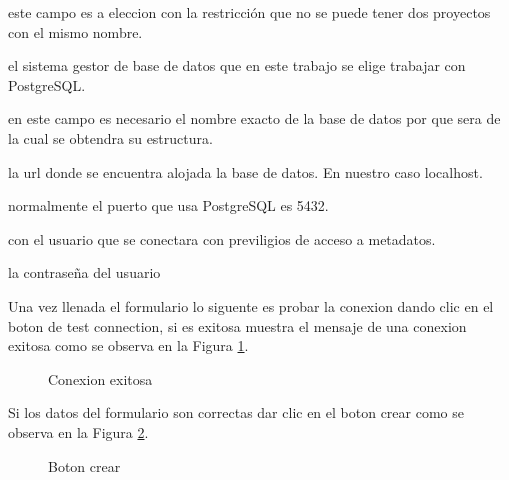 \begin{description}[align=left]
\item [Nombre] este campo es a eleccion con la restricci\'on que no se puede tener dos proyectos con el mismo nombre.
\item [sgbd] el sistema gestor de base de datos que en este trabajo se elige trabajar con PostgreSQL.
\item [base de datos] en este campo es necesario el nombre exacto de la base de datos por que sera de la cual se obtendra su estructura.
\item [host] la url donde se encuentra alojada la base de datos. En nuestro caso localhost.
\item [puerto] normalmente el puerto que usa PostgreSQL es 5432.
\item [usuario] con el usuario que se conectara con previligios de acceso a metadatos.
\item [password] la contrase\~na del usuario
\end{description}
Una vez llenada el formulario lo siguente es probar la conexion dando clic en el boton de test connection, si es exitosa muestra el mensaje de una conexion exitosa como se observa en la Figura \ref{fig:connectionsuccessfull}.
\begin{figure}[H]
\caption{Conexion exitosa} \label{fig:connectionsuccessfull}
\centering
{}
\end{figure}
Si los datos del formulario son correctas dar clic en el boton crear como se observa en la  Figura \ref{fig:createbutton}. 
\begin{figure}[H]
\caption{Boton crear} \label{fig:createbutton}
\centering
{}
\end{figure}
